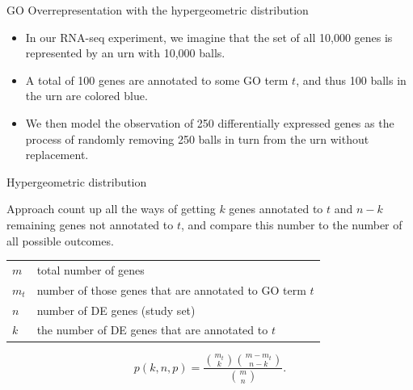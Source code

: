 \documentclass{beamer}
\begin{document}

\begin{frame}{GO Overrepresentation with the hypergeometric distribution}
\begin{itemize}
\item In our
RNA-seq experiment, we imagine that the set of all 10,000 genes is represented by an urn with 10,000 balls.
\item  A total of 100 genes are
annotated to some GO term $t$, and thus 100 balls in the urn are
colored blue.
\item We then model the observation of 250 differentially
expressed genes as the process of randomly removing 250 balls in turn
from the urn without replacement. 
\end{itemize}
   
\end{frame}


\begin{frame}{Hypergeometric distribution}
\begin{mybluebox}{Approach}
count up all the ways of getting $k$ genes annotated to $t$ and $n-k$
remaining genes not annotated to $t$, and compare this number to the
number of all possible outcomes. 
\end{mybluebox}

\begin{tabular}{ll}
$m$ & total number of genes\\
$m_t$ & number of those genes that are annotated to GO term $t$\\
$n$ & number of DE genes (study set) \\
$k$& the number of DE genes that are annotated to $t$\\
\end{tabular}

\vspace{4mm}

\begin{equation}
 \label{eq:hypergeometric}
p(k,n,p)  = \dfrac{\binom{m_t}{k}\binom{m-m_t}{n-k}}{\binom{m}{n}}.
\end{equation}
\end{frame}
\end{document}
